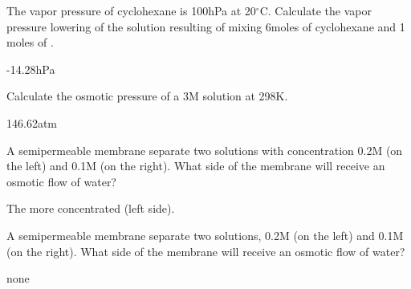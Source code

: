 \documentclass[main.tex]{subfiles}
\begin{document}
\begin{multicols*}{2}
\begin{question}[ID=\the\value{numA}]
The vapor pressure of cyclohexane is 100hPa at 20$^{\circ}$C. Calculate the vapor pressure lowering of the solution resulting of mixing 6moles of cyclohexane and 1 moles of .
\end{question}
\begin{solution}
-14.28hPa
\hspace{0.1cm}\end{solution}%


\begin{question}[ID=\the\value{numA}]
Calculate the osmotic pressure of a 3M  solution at 298K.
\end{question}
\begin{solution}
146.62atm
\hspace{0.1cm}\end{solution}%


\begin{question}[ID=\the\value{numA}]
A semipermeable membrane separate two  solutions with concentration 0.2M (on the left) and 0.1M (on the right). What side of the membrane will receive an osmotic flow of water?
\end{question}
\begin{solution}
The more concentrated (left side).
\hspace{0.1cm}\end{solution}%

\begin{question}[ID=\the\value{numA}]
A semipermeable membrane separate two solutions, 0.2M  (on the left) and 0.1M  (on the right). What side of the membrane will receive an osmotic flow of water?
\end{question}
\begin{solution}
none
\hspace{0.1cm}\end{solution}%




\end{multicols*}
\end{document}
